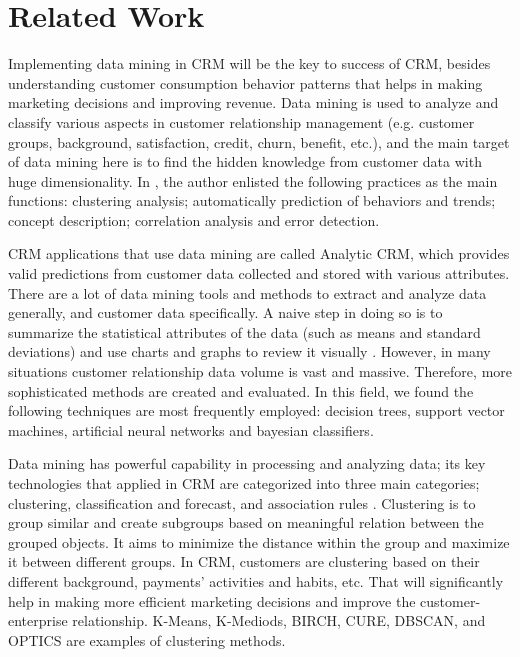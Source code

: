 \documentclass[journal]{IEEEtran}
\begin{document}
\section{Related Work}\label{Sec:Related Work}
%
Implementing data mining in CRM will be the key to success of CRM, besides understanding customer consumption behavior patterns that helps in making marketing decisions and improving revenue. Data mining is used to analyze and classify various aspects in customer relationship management (e.g. customer groups, background, satisfaction, credit, churn, benefit, etc.), and the main target of data mining here is to find the hidden knowledge from customer data with huge dimensionality. In \cite{Ref:DataMiningApplicationInCRM}, the author enlisted the following practices as the main functions: clustering analysis; automatically prediction of behaviors and trends; concept description; correlation analysis and error detection.
\par
CRM applications that use data mining are called Analytic CRM, which provides valid predictions from customer data collected and stored with various attributes. There are a lot of data mining tools and methods to extract and analyze data generally, and customer data specifically. A naive step in doing so is to summarize the statistical attributes of the data (such as means and standard deviations) and use charts and graphs to review it visually \cite{Ref:DataMiningStrategiesforCRM}. However, in many situations customer relationship data volume is vast and massive. Therefore, more sophisticated methods are created and evaluated. In this field, we found the following techniques are most frequently employed: decision trees, support vector machines, artificial neural networks and bayesian classifiers.
\par
Data mining has powerful capability in processing and analyzing data; its key technologies that applied in CRM are categorized into three main categories; clustering, classification and forecast, and association rules \cite{Ref:ApplicationOfDataMiningInCRM}. Clustering is to group similar and create subgroups based on meaningful relation between the grouped objects. It aims to minimize the distance within the group and maximize it between different groups. In CRM, customers are clustering based on their different background, payments’ activities and habits, etc. That will significantly help in making more efficient marketing decisions and improve the customer-enterprise relationship. K-Means, K-Mediods, BIRCH, CURE, DBSCAN, and OPTICS are examples of clustering methods.
\end{document}
